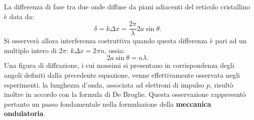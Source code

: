 \newpage
La differenza di fase tra due onde diffuse  da piani adiacenti del reticolo cristallino è data da:
	\begin{equation}
		\delta = k \Delta x = \frac{2 \pi}{\lambda} 2a \sin \theta.
	\end{equation}
Si osserverà allora interferenza costruttiva quando questa differenza è pari ad un multiplo intero di $2 \pi$: $k \Delta x = 2 \pi n$, ossia:
	\begin{equation}
		\boxed{
			2a \sin \theta = n\lambda.
			}
	\end{equation}
Una figura di diffrazione, i cui massimi si presentano in corrispondenza degli angoli definiti dalla precedente equazione, venne effettivamente osservata negli esperimenti. la lunghezza d'onda, associata ad elettroni di impulso $p$, risultò inoltre in accordo con la formula di De Broglie. Questa osservazione rappresentò pertanto un passo fondamentale nella formulazione della \textbf{meccanica ondulatoria}.
